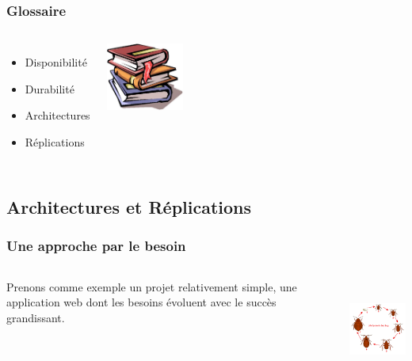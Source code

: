 \documentclass[english]{beamer}
\begin{document}
\begin{frame}
  \frametitle{Glossaire}
  
  \linebreak

\begin{columns}[c]

  \begin{itemize}
    \item<1,5> Disponibilité
    \item<2,5> Durabilité
    \item<3,5> Architectures
    \item<4,5> Réplications
  \end{itemize}  

\includegraphics[height=6em]{glossaire.jpg}
\end{columns}
\end{frame}

\subsection{Architectures et Réplications}

\begin{frame}[fragile]
  \frametitle{Une approche par le besoin}

  \linebreak

\begin{columns}[c]

  Prenons comme exemple un projet relativement simple, une application web
  dont les besoins évoluent avec le succès grandissant.


\includegraphics[height=9em]{bedbugslifecycle.png}
\end{columns}

\end{frame}
\end{document}
